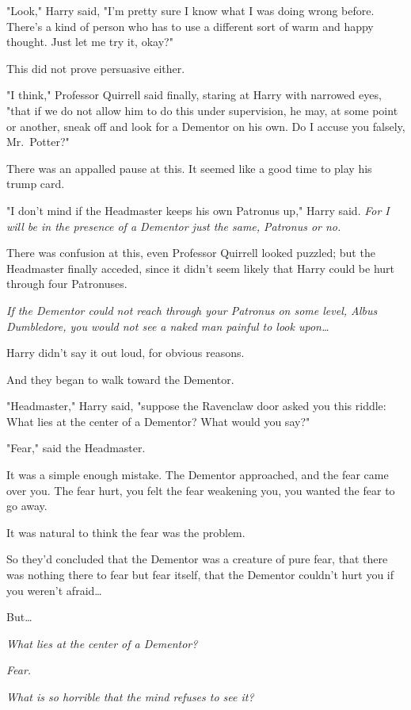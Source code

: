 "Look," Harry said, "I'm pretty sure I know what I was doing wrong before. 
There's a kind of person who has to use a different sort of warm and happy 
thought. Just let me try it, okay?"

This did not prove persuasive either.

"I think," Professor Quirrell said finally, staring at Harry with narrowed 
eyes, "that if we do not allow him to do this under supervision, he may, at 
some point or another, sneak off and look for a Dementor on his own. Do I 
accuse you falsely, Mr.~Potter?"

There was an appalled pause at this. It seemed like a good time to play his 
trump card.

"I don't mind if the Headmaster keeps his own Patronus up," Harry said. 
\emph{For I will be in the presence of a Dementor just the same, Patronus or 
no.}

There was confusion at this, even Professor Quirrell looked puzzled; but the 
Headmaster finally acceded, since it didn't seem likely that Harry could be 
hurt through four Patronuses.

\emph{If the Dementor could not reach through your Patronus on some level, 
Albus Dumbledore, you would not see a naked man painful to look upon{\ldots}}

Harry didn't say it out loud, for obvious reasons.

And they began to walk toward the Dementor.

"Headmaster," Harry said, "suppose the Ravenclaw door asked you this riddle: 
What lies at the center of a Dementor? What would you say?"

"Fear," said the Headmaster.

It was a simple enough mistake. The Dementor approached, and the fear came over 
you. The fear hurt, you felt the fear weakening you, you wanted the fear to go 
away.

It was natural to think the fear was the problem.

So they'd concluded that the Dementor was a creature of pure fear, that there 
was nothing there to fear but fear itself, that the Dementor couldn't hurt you 
if you weren't afraid{\ldots}

But{\ldots}

\emph{What lies at the center of a Dementor?}

\emph{Fear.}

\emph{What is so horrible that the mind refuses to see it?}

